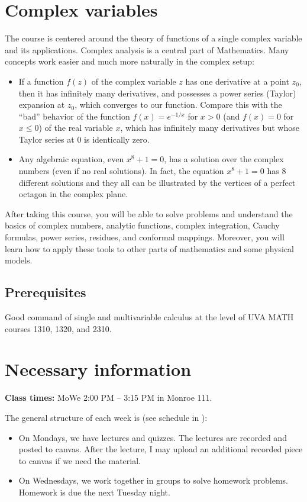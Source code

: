 \documentclass[oneside,11pt]{amsart}
\begin{document}
\section{Complex variables}

The course is centered around the theory of functions of a single complex variable and its applications. Complex analysis is a central part of Mathematics. Many concepts work easier and much more naturally in the complex setup:
\begin{itemize}
	\item 
If a function $f(z)$ 
of the complex variable $z$
has one 
derivative at a point $z_0$, then it has infinitely many derivatives,
and possesses a power series (Taylor) expansion at $z_0$, which converges to our function. 
Compare this with the “bad” behavior of the function 
$f(x)=e^{-1/x}$ for $x>0$ (and $f(x)=0$ for $x\le 0$) of the real variable $x$,
which has infinitely many derivatives but whose Taylor series at $0$ is 
identically zero.
\item Any algebraic equation, even $x^{8}+1=0$,
	has a solution over the complex numbers (even
	if no real solutions). In fact, 
	the equation $x^{8}+1=0$ has $8$ different solutions and they all can be 
	illustrated by the vertices of a perfect octagon
	in the complex plane.
\end{itemize}

After taking this course, you 
will be able to solve problems and understand the 
basics of
complex numbers, analytic functions, 
complex integration, Cauchy formulas, power series, 
residues, and conformal mappings.
Moreover, you will learn how to apply these tools to other parts of mathematics and some physical models.

\subsection*{Prerequisites}

Good command of single and multivariable calculus at the level of UVA MATH courses 1310, 1320, and 2310.

\section{Necessary information}
\bigskip

\textbf{Class times:} MoWe 2:00 PM -- 3:15 PM in Monroe 111.

The general structure of each week is (see schedule in ):
\begin{itemize}
	\item On Mondays, we have lectures and quizzes. 
	The lectures are recorded and posted to canvas. After the lecture, I may upload an 
	additional recorded piece to canvas if we need the material.
	\item On Wednesdays, we work together in groups to solve homework problems. Homework is due the next Tuesday night.
\end{itemize}
\end{document}
